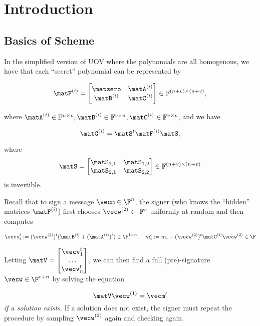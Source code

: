 \newcommand{\bbF}{\mathbb{F}}
\section{Introduction}

\subsection{Basics of Scheme}
\label{sec:basics-scheme}



In the simplified version of UOV where the polynomials are all
homogenous, we have that each ``secret'' polynomial can be represented by 

\[\matF^{(i)} = \begin{bmatrix}\matzero&\matA^{(i)}\\\matB^{(i)} &
  \matC^{(i)}\\\end{bmatrix} \in \mathbb{F}^{(n+v) \times (n+v)},\]

where $\matA^{(i)} \in \bbF^{n \times v}, \matB^{(i)} \in \bbF^{v
  \times n}, \matC^{(i)} \in \bbF^{v \times v}$, and we have 

\[\matG^{(i)}=\matS^{t}\matF^{(i)}\matS,\]

where 
\[\matS
= \begin{bmatrix}\matS_{1,1}&\matS_{1,2}\\\matS_{2,1}&\matS_{2,2}\\\end{bmatrix} \in
  \bbF^{(n+v) \times (n+v)}\]
 is invertible. 




Recall that to sign a message $\vecm \in \F^{n}$, the signer (who
knows the ``hidden'' matrices $\matF^{(i)}$) first chooses
$\vecw^{(2)} \gets \mathbb{F}^{v}$ uniformly at random
and then computes 

\[\vecv_i^t := (\vecw^{(2)})^t(\matB^{(i)}+(\matA^{(i)})^t) \in \F^{1
  \times n}, \quad m'_i := m_i -
(\vecw^{(2)})^t\matC^{(i)}\vecw^{(2)} \in \F\]

Letting $\matV = \begin{bmatrix}\vecv_1^{t}\\ \ldots \\ \vecv_n^t
  \\\end{bmatrix}$, we can then find a full (pre)-signature $\vecw \in
\F^{v+n}$ by solving the equation

\begin{equation}\label{eq:solvesystem}
\matV\vecw^{(1)}=\vecm'\end{equation}
\emph{if a solution exists}. If a solution
does not exist, the signer must repeat the procedure by sampling $\vecw^{(2)}$
again and checking again. 

